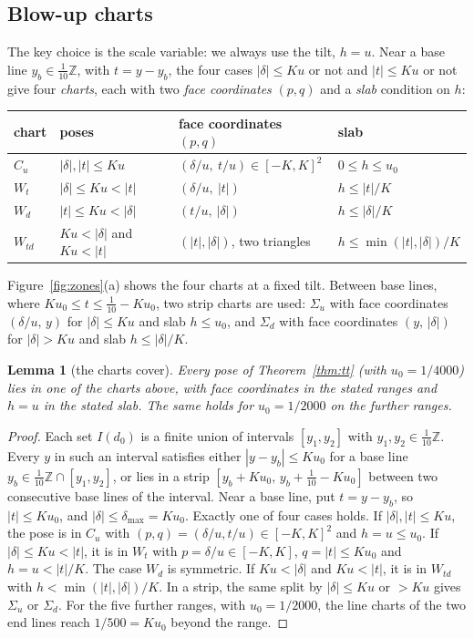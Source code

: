 \documentclass[11pt]{amsart}
\newtheorem{lemma}[theorem]{Lemma}
\theoremstyle{definition}
\theoremstyle{remark}
\newcommand{\Z}{\mathbb Z}
\begin{document}
\subsection{Blow-up charts}
The key choice is the scale variable: we always use the tilt, $h=u$. Near a base line $y_b\in\frac1{10}\Z$, with
$t=y-y_b$, the four cases $|\delta|\le Ku$ or not and $|t|\le Ku$ or not give four \emph{charts}, each with two
\emph{face coordinates} $(p,q)$ and a \emph{slab} condition on $h$:

\begin{center}
\begin{tabular}{llll}
\toprule
chart & poses & face coordinates $(p,q)$ & slab \\
\midrule
$C_u$ & $|\delta|,|t|\le Ku$ & $(\delta/u,\ t/u)\in[-K,K]^2$ & $0\le h\le u_0$\\
$W_t$ & $|\delta|\le Ku<|t|$ & $(\delta/u,\ |t|)$ & $h\le|t|/K$\\
$W_d$ & $|t|\le Ku<|\delta|$ & $(t/u,\ |\delta|)$ & $h\le|\delta|/K$\\
$W_{td}$ & $Ku<|\delta|$ and $Ku<|t|$ & $(|t|,|\delta|)$, two triangles & $h\le\min(|t|,|\delta|)/K$\\
\bottomrule
\end{tabular}
\end{center}

\noindent Figure~\ref{fig:zones}(a) shows the four charts at a fixed tilt. Between base lines, where
$Ku_0\le t\le\frac1{10}-Ku_0$, two strip charts are used: $\Sigma_u$ with face
coordinates $(\delta/u,\,y)$ for $|\delta|\le Ku$ and slab $h\le u_0$, and $\Sigma_d$ with face coordinates
$(y,\,|\delta|)$ for $|\delta|>Ku$ and slab $h\le|\delta|/K$.

\begin{lemma}[the charts cover]\label{lem:charts}
Every pose of Theorem~\ref{thm:tt} (with $u_0=1/4000$) lies in one of the charts above, with face coordinates in the
stated ranges and $h=u$ in the stated slab. The same holds for $u_0=1/2000$ on the further ranges.
\end{lemma}

\begin{proof}
Each set $I(d_0)$ is a finite union of intervals $[y_1,y_2]$ with $y_1,y_2\in\frac1{10}\Z$. Every $y$ in such an
interval satisfies either $|y-y_b|\le Ku_0$ for a base line $y_b\in\frac1{10}\Z\cap[y_1,y_2]$, or lies in a strip
$[y_b+Ku_0,\,y_b+\frac1{10}-Ku_0]$ between two consecutive base lines of the interval. Near a base line, put
$t=y-y_b$, so $|t|\le Ku_0$, and $|\delta|\le\delta_{\max}=Ku_0$. Exactly one of four cases holds. If
$|\delta|,|t|\le Ku$, the pose is in $C_u$ with $(p,q)=(\delta/u,t/u)\in[-K,K]^2$ and $h=u\le u_0$. If
$|\delta|\le Ku<|t|$, it is in $W_t$ with $p=\delta/u\in[-K,K]$, $q=|t|\le Ku_0$ and $h=u<|t|/K$. The case
$W_d$ is symmetric. If $Ku<|\delta|$ and $Ku<|t|$, it is in $W_{td}$ with $h<\min(|t|,|\delta|)/K$. In a strip, the
same split by $|\delta|\le Ku$ or $>Ku$ gives $\Sigma_u$ or $\Sigma_d$. For the five further ranges, with
$u_0=1/2000$, the line charts of the two end lines reach $1/500=Ku_0$ beyond the range. \end{proof}
\end{document}
